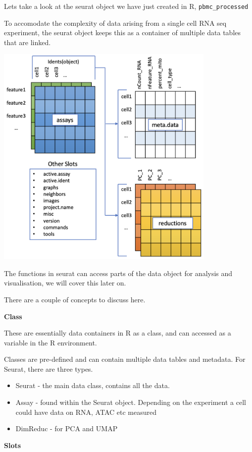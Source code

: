\documentclass[
]{book}
\providecommand{\tightlist}{%
  \setlength{\itemsep}{0pt}\setlength{\parskip}{0pt}}
\begin{document}
Lets take a look at the seurat object we have just created in R, \texttt{pbmc\_processed}

To accomodate the complexity of data arising from a single cell RNA seq experiment, the seurat object keeps this as a container of multiple data tables that are linked.

\includegraphics[width=0.8\textwidth,height=\textheight]{images/seuratobject.png}

The functions in seurat can access parts of the data object for analysis and visualisation, we will cover this later on.

There are a couple of concepts to discuss here.

\textbf{Class}

These are essentially data containers in R as a class, and can accessed as a variable in the R environment.

Classes are pre-defined and can contain multiple data tables and metadata. For Seurat, there are three types.

\begin{itemize}
\tightlist
\item
  Seurat - the main data class, contains all the data.
\item
  Assay - found within the Seurat object. Depending on the experiment a cell could have data on RNA, ATAC etc measured
\item
  DimReduc - for PCA and UMAP
\end{itemize}

\textbf{Slots}
\end{document}
